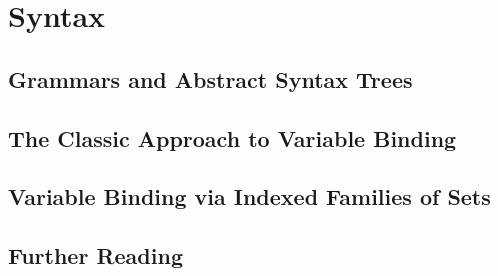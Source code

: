 \chapter{Syntax}

\section{Grammars and Abstract Syntax Trees}

\section{The Classic Approach to Variable Binding}

\section{Variable Binding via Indexed Families of Sets}

\section{Further Reading}

